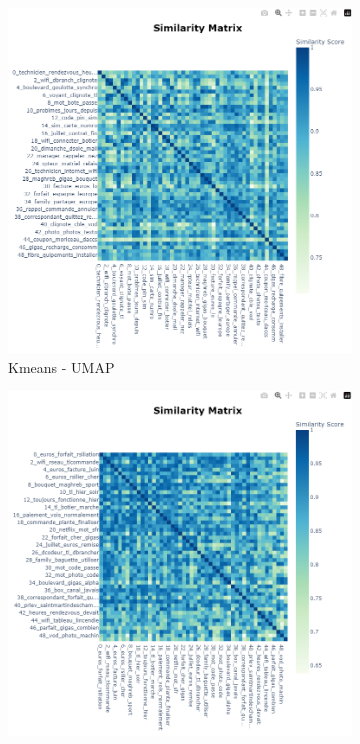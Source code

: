 \begin{figure}[H]
    \centering
        \begin{subfigure}{0.43\textwidth}
        \includegraphics[width=\linewidth]{images/results/cam/kmeans_umap.png}
        \caption{Kmeans - UMAP}
    \end{subfigure}
    \begin{subfigure}{0.43\textwidth}
        \includegraphics[width=\linewidth]{images/results/cam/kmeans_pca.png}

\end{subfigure}
\end{figure}
